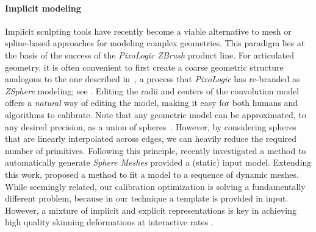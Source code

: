 \paragraph{Implicit modeling}
Implicit sculpting tools have recently become a viable alternative to mesh or spline-based approaches for modeling complex geometries. This paradigm lies at the basis of the success of the \emph{PixoLogic ZBrush\textcopyright} product line. 
For articulated geometry, it is often convenient to first create a coarse geometric structure analogous to the one described in~, a process that \emph{PixoLogic} has re-branded as \emph{ZSphere{\textcopyright}} modeling; see . Editing the radii and centers of the convolution model offers a \emph{natural} way of editing the model, making it easy for both humans and algorithms to calibrate.
Note that any geometric model can be approximated, to any desired precision, as a union of spheres~\cite{tagliasacchi2016skeletons}. 
However, by considering spheres that are linearly interpolated across edges, we can heavily reduce the required number of primitives. Following this principle, \cite{thiery2013sphere} recently investigated a method to automatically generate \emph{Sphere Meshes} provided a  (static) input model. Extending this work, \cite{thiery2016spheremesh} proposed a method to fit a model to a sequence of dynamic meshes. While seemingly related, our calibration optimization is solving a fundamentally different problem, because in our technique a template is provided in input. However, a mixture of implicit and explicit representations is key in achieving high quality skinning deformations at interactive rates \cite{vaillant2013implicit,vaillant2014robust}.

\endinput


